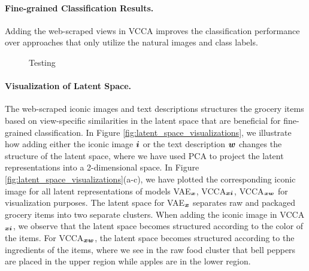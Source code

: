 \paragraph{Fine-grained Classification Results.} Adding the web-scraped views in VCCA improves the classification performance over approaches that only utilize the natural images and class labels. ​


\begin{figure}[t]
	\centering
	\setlength{\figwidth}{0.62\textwidth}
	\setlength{\figheight}{.22\textheight}
	
	\vspace{-2mm}
	\caption{Testing}
	\label{fig:testing}
	\vspace{-4mm}
\end{figure}


\paragraph{Visualization of Latent Space.} The web-scraped iconic images and text descriptions structures the grocery items based on view-specific similarities in the latent space that are beneficial for fine-grained classification. In Figure \ref{fig:latent_space_visualizations}, we illustrate how adding either the iconic image ${\bm{i}}$ or the text description ${\bm{w}}$ changes the structure of the latent space, where we have used PCA to project the latent representations into a 2-dimensional space. In Figure \ref{fig:latent_space_visualizations}(a-c), we have plotted the corresponding iconic image for all latent representations of models VAE$_{{\bm{x}}}$, VCCA$_{{\bm{x}} {\bm{i}}}$, VCCA$_{{\bm{x}} {\bm{w}}}$ for visualization purposes. The latent space for VAE$_{{\bm{x}}}$ separates raw and packaged grocery items into two separate clusters. When adding the iconic image in VCCA$_{{\bm{x}} {\bm{i}}}$, we observe that the latent space becomes structured according to the color of the items. For VCCA$_{{\bm{x}} {\bm{w}}}$, the latent space becomes structured according to the ingredients of the items, where we see in the raw food cluster that bell peppers are placed in the upper region while apples are in the lower region. 


